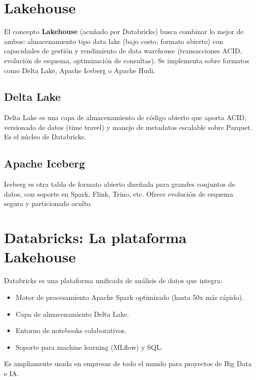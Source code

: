 \documentclass[12pt,a4paper,openany,oneside]{book}
\begin{document}
\section{Lakehouse}
El concepto \textbf{Lakehouse} (acuñado por Databricks) busca combinar lo mejor de ambos: almacenamiento tipo data lake (bajo costo, formato abierto) con capacidades de gestión y rendimiento de data warehouse (transacciones ACID, evolución de esquema, optimización de consultas). Se implementa sobre formatos como Delta Lake, Apache Iceberg o Apache Hudi.

\begin{center}
\end{center}

\subsection{Delta Lake}
Delta Lake es una capa de almacenamiento de código abierto que aporta ACID, versionado de datos (time travel) y manejo de metadatos escalable sobre Parquet. Es el núcleo de Databricks.

\subsection{Apache Iceberg}
Iceberg es otra tabla de formato abierto diseñada para grandes conjuntos de datos, con soporte en Spark, Flink, Trino, etc. Ofrece evolución de esquema segura y particionado oculto.

\section{Databricks: La plataforma Lakehouse}
Databricks es una plataforma unificada de análisis de datos que integra:
\begin{itemize}
    \item Motor de procesamiento Apache Spark optimizado (hasta 50x más rápido).
    \item Capa de almacenamiento Delta Lake.
    \item Entorno de notebooks colaborativos.
    \item Soporte para machine learning (MLflow) y SQL.
\end{itemize}
Es ampliamente usada en empresas de todo el mundo para proyectos de Big Data e IA.
\end{document}

